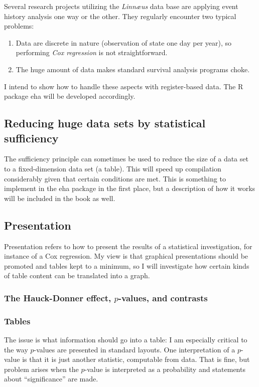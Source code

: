 \documentclass[a4paper,11pt]{article}
\begin{document}
Several research projects utilizing the \emph{Linn{\ae}us} data base are
applying event history analysis one way or the other. They regularly
encounter two typical problems:

\begin{enumerate}

\item Data are discrete in nature (observation of state one day per year),
  so performing \emph{Cox regression} is not straightforward.
\item The huge amount of data makes standard survival analysis programs
  choke.
\end{enumerate}  

I intend to show how to handle these aspects with register-based data. The
R package eha \citep{eha} will be developed accordingly.

\subsection{Reducing huge data sets by statistical sufficiency}

The sufficiency principle can sometimes be used to reduce the size of a data set 
to a fixed-dimension data set (a table). This will speed up compilation considerably
given that certain conditions are met. This is something to implement in the eha
package in the first place, but a description of how it works will be included 
in the book as well.
\subsection{Presentation}

Presentation refers to how to present the results of a statistical
investigation, for instance of a Cox regression. My view is that graphical
presentations should be promoted and tables kept to a minimum, so I will
investigate how certain kinds of table content can be translated into a graph.

\subsubsection{The Hauck-Donner effect, $p$-values, and contrasts}

\subsubsection{Tables}

The issue is what information should go into a table: I am especially
critical to the way $p$-values are presented in standard layouts.  One
interpretation of a $p$-value is that it is just another statistic,
computable from data. That is fine, but problem arises when the $p$-value is
interpreted as a probability and statements about ``significance'' are made.
\end{document}
